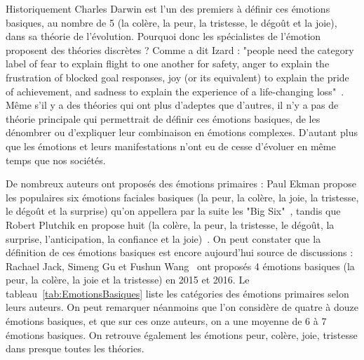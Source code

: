 Historiquement Charles Darwin est l'un des premiers à définir ces émotions basiques, au nombre de 5 (la colère, la peur, la tristesse, le dégoût et la joie), dans sa théorie de l'évolution. Pourquoi donc les spécialistes de l'émotion proposent des théories discrètes ?
Comme a dit Izard : "people need the category label of fear to explain flight to one another for safety, anger to explain the frustration of blocked goal responses, joy (or its equivalent) to explain the pride of achievement, and sadness to explain the experience of a life-changing loss"~\cite{Izard2007}.
Même s'il y a des théories qui ont plus d'adeptes que d'autres, il n'y a pas de théorie principale qui permettrait de définir ces émotions basiques, de les dénombrer ou d'expliquer leur combinaison en émotions complexes. D'autant plus que les émotions et leurs manifestations n'ont eu de cesse d'évoluer en même temps que nos sociétés.



De nombreux auteurs ont proposés des émotions primaires : Paul Ekman propose les populaires six émotions faciales basiques (la peur, la colère, la joie, la tristesse, le dégoût et la surprise) qu'on appellera par la suite les "Big Six"~\cite{Ekman1999}, tandis que Robert Plutchik en propose huit (la colère, la peur, la tristesse, le dégoût, la surprise, l'anticipation, la confiance et la joie)~\cite{Plutchik1980}. On peut constater que la définition de ces émotions basiques est encore aujourd'hui source de discussions : Rachael Jack, Simeng Gu et Fushun Wang~\cite{Jack2016,Gu2015,Wang2016} ont proposés 4 émotions basiques (la peur, la colère, la joie et la tristesse) en 2015 et 2016. Le tableau~\ref{tab:EmotionsBasiques} liste les catégories des émotions primaires selon leurs auteurs. On peut remarquer néanmoins que l'on considère de quatre à douze émotions basiques, et que sur ces onze auteurs, on a une moyenne de 6 à 7 émotions basiques. On retrouve également les émotions peur, colère, joie, tristesse dans presque toutes les théories.


